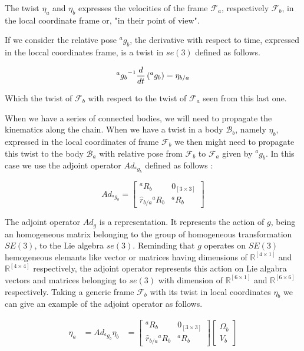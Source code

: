 \documentclass[12pt,a4paper]{book}
\newcommand{\Fa}{\ensuremath{\mathcal{F}_a}}
\newcommand{\Fb}{\ensuremath{\mathcal{F}_b}}
\newcommand{\Ba}{\ensuremath{\mathcal{B}_a}}
\newcommand{\Bb}{\ensuremath{\mathcal{B}_b}}
\newcommand{\agb}{\ensuremath{{^a g _b}}}
\newcommand{\aRb}{\ensuremath{{^a R _b}}}
\newcommand{\hatrba}{\ensuremath{{\hat{r}_{b/a}}}}
\newcommand{\etaa}{\ensuremath{{\eta_{a}}}}
\newcommand{\etab}{\ensuremath{{\eta_{b}}}}
\newcommand{\Adagb}{\ensuremath{Ad_{\agb}}}
\begin{document}
The twist $\eta_{a}$ and $\eta_{b}$ expresses the velocities of the frame \Fa{}, respectively \Fb{}, in the local coordinate frame or, "in their point of view".

If we consider the relative pose \agb{}, the derivative with respect to time, expressed in the loccal coordinates frame, is a twist in $se(3)$ defined as follows. 

\begin{equation}
	\agb \inv \frac{d}{dt}\left( \agb \right) = \eta	_{b/a}
\end{equation}

Which the twist of \Fb{} with respect to the twist of \Fa{} seen from this last one.

When we have a series of connected bodies, we will need to propagate the kinematics along the chain. When we have a twist in a body \Bb{}, namely \etab{}, expressed in the local coordinates of frame \Fb{} we then might need to propagate this twist to the body \Ba{} with relative pose from \Fb{} to \Fa{} given by \agb{}. In this case we use the adjoint operator \Adagb{} defined as follows :


\begin{equation}
	\Adagb = 
	\begin{bmatrix}
		\aRb	&	0_{[3\times 3]}	\\
		\hatrba \aRb	&	\aRb
	\end{bmatrix}
\end{equation}


The adjoint operator $Ad_g$ is a representation. It represents the action of $g$, being an homogeneous matrix belonging to the group of homogeneous transformation $SE(3)$, to the Lie algebra $se(3)$. Reminding that $g$ operates on $SE(3)$ hemogeneous elemants like vector or matrices having dimensions of $\mathbb{R}^{[4 \times 1]}$ and $\mathbb{R}^{[4 \times 4]}$ respectively, the adjoint operator represents this action on Lie algabra vectors and matrices belonging to $se(3)$ with dimension of $\mathbb{R}^{[6 \times 1]}$ and $\mathbb{R}^{[6 \times 6]}$ respectively.
Taking a generic frame \Fb{} with its twist in local coordinates $\etab$ we can give an example of the adjoint operator as follows.

\begin{equation}
\begin{aligned}
	\etaa 	&= \Adagb \etab
			&=
			\begin{bmatrix}
				\aRb	&	0_{[3\times 3]}	\\
				\hatrba \aRb	&	\aRb
			\end{bmatrix}
			\begin{bmatrix}
				\Omega_b	\\
				V_b
			\end{bmatrix}
\end{aligned}
\end{equation}
\end{document}
